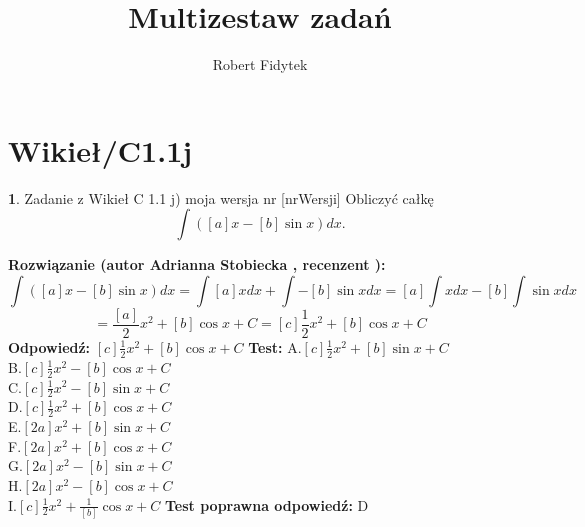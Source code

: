 \documentclass[12pt, a4paper]{article}
\title{Multizestaw zadań}
\author{Robert Fidytek}
\date{}
\theoremstyle{definition} %
\newtheorem{zad}{}
\newcommand{\kategoria}[1]{\section{#1}} %
\newcommand{\zadStart}[1]{\begin{zad}#1\newline} %
\newcommand{\zadStop}{\end{zad}}   %
\newcommand{\rozwStart}[2]{\noindent \textbf{Rozwiązanie (autor #1 , recenzent #2): }\newline} %
\newcommand{\rozwStop}{\newline}                                            %
\newcommand{\odpStart}{\noindent \textbf{Odpowiedź:}\newline}    %
\newcommand{\odpStop}{\newline}                                             %
\newcommand{\testStart}{\noindent \textbf{Test:}\newline} %
\newcommand{\testStop}{\newline} %
\newcommand{\kluczStart}{\noindent \textbf{Test poprawna odpowiedź:}\newline} %
\newcommand{\kluczStop}{\newline} %
\begin{document}
\maketitle


\kategoria{Wikieł/C1.1j}
\zadStart{Zadanie z Wikieł C 1.1 j) moja wersja nr [nrWersji]}
Obliczyć całkę $$\int([a]x-[b]\sin{x})dx.$$
\zadStop
\rozwStart{Adrianna Stobiecka}{}
$$\int([a]x-[b]\sin{x})dx=\int[a]xdx+\int-[b]\sin{x}dx=[a]\int xdx-[b]\int\sin{x}dx$$
$$=\frac{[a]}{2}x^2+[b]\cos{x}+C=[c]\frac{1}{2}x^2+[b]\cos{x}+C$$
\rozwStop
\odpStart
$[c]\frac{1}{2}x^2+[b]\cos{x}+C$
\odpStop
\testStart
A.$[c]\frac{1}{2}x^2+[b]\sin{x}+C$\\
B.$[c]\frac{1}{2}x^2-[b]\cos{x}+C$\\
C.$[c]\frac{1}{2}x^2-[b]\sin{x}+C$\\
D.$[c]\frac{1}{2}x^2+[b]\cos{x}+C$\\
E.$[2a]x^2+[b]\sin{x}+C$\\
F.$[2a]x^2+[b]\cos{x}+C$\\
G.$[2a]x^2-[b]\sin{x}+C$\\
H.$[2a]x^2-[b]\cos{x}+C$\\
I.$[c]\frac{1}{2}x^2+\frac{1}{[b]}\cos{x}+C$
\testStop
\kluczStart
D
\kluczStop
\end{document}
